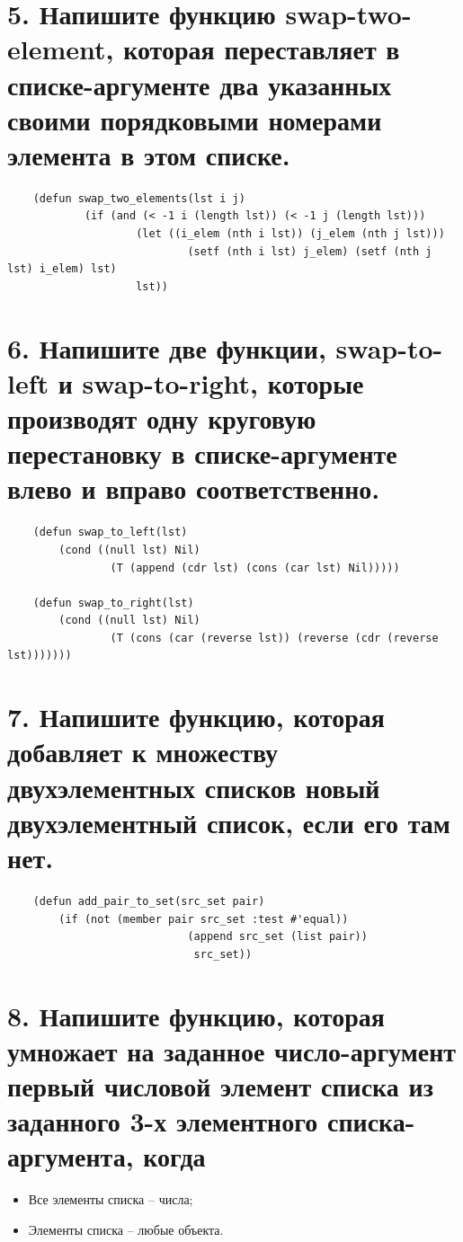\documentclass[12pt]{report}
\begin{document}
\section*{5. Напишите функцию swap-two-element, которая переставляет в списке-аргументе два указанных своими порядковыми номерами элемента в этом списке.}

\begin{lstlisting}
	(defun swap_two_elements(lst i j)
			(if (and (< -1 i (length lst)) (< -1 j (length lst)))
					(let ((i_elem (nth i lst)) (j_elem (nth j lst)))
							(setf (nth i lst) j_elem) (setf (nth j lst) i_elem) lst)
					lst))
\end{lstlisting}

\section*{6. Напишите две функции, swap-to-left и swap-to-right, которые производят одну круговую перестановку в списке-аргументе влево и вправо соответственно.}

\begin{lstlisting}
	(defun swap_to_left(lst)
		(cond ((null lst) Nil)
				(T (append (cdr lst) (cons (car lst) Nil)))))
	
	(defun swap_to_right(lst)
		(cond ((null lst) Nil)
				(T (cons (car (reverse lst)) (reverse (cdr (reverse lst)))))))
\end{lstlisting}

\section*{7. Напишите функцию, которая добавляет к множеству двухэлементных списков новый двухэлементный список, если его там нет.}

\begin{lstlisting}
	(defun add_pair_to_set(src_set pair)
		(if (not (member pair src_set :test #'equal)) 
							(append src_set (list pair))
							 src_set))
\end{lstlisting}

\section*{8. Напишите функцию, которая умножает на заданное число-аргумент первый числовой элемент списка из заданного 3-х элементного списка-аргумента, когда}

\begin{itemize}
	\item Все элементы списка -- числа;
	\item Элементы списка -- любые объекта.
\end{itemize}
\end{document}
